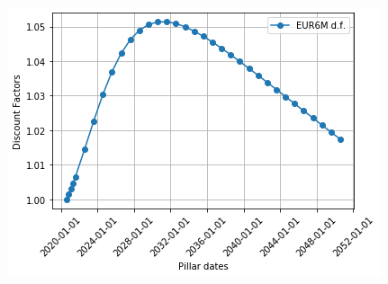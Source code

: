 \begin{figure}[htb]
\begin{center}
  \includegraphics[width=0.7\linewidth]{figures/ex5.5.png}
\end{center}
\end{figure}



